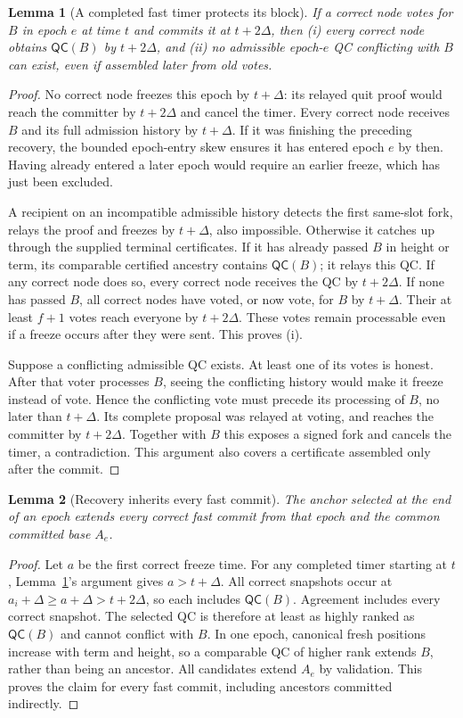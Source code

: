 \documentclass[10pt,a4paper]{article}
\newcommand{\QC}{\mathsf{QC}}
\newtheorem{lemma}{Lemma}
\begin{document}
\begin{lemma}[A completed fast timer protects its block]\label{lem:timer}
If a correct node votes for $B$ in epoch $e$ at time $t$ and commits it at
$t+2\Delta$, then (i) every correct node obtains $\QC(B)$ by $t+2\Delta$,
and (ii) no admissible epoch-$e$ QC conflicting with $B$ can exist, even if
assembled later from old votes.
\end{lemma}
\begin{proof}
No correct node freezes this epoch by $t+\Delta$: its relayed quit proof
would reach the committer by $t+2\Delta$ and cancel the timer. Every correct
node receives $B$ and its full admission history by $t+\Delta$. If it was
finishing the preceding recovery, the bounded epoch-entry skew ensures it
has entered epoch $e$ by then. Having already entered a later epoch would
require an earlier freeze, which has just been excluded.

A recipient on an incompatible admissible history detects the first
same-slot fork, relays the proof and freezes by $t+\Delta$, also impossible.
Otherwise it catches up through the supplied terminal certificates. If it
has already passed $B$ in height or term, its comparable certified ancestry
contains $\QC(B)$; it relays this QC. If any correct node does so, every
correct node receives the QC by $t+2\Delta$. If none has passed $B$, all
correct nodes have voted, or now vote, for $B$ by $t+\Delta$. Their at least
$f+1$ votes reach everyone by $t+2\Delta$. These votes remain processable
even if a freeze occurs after they were sent. This proves (i).

Suppose a conflicting admissible QC exists. At least one of its votes is
honest. After that voter processes $B$, seeing the conflicting history would
make it freeze instead of vote. Hence the conflicting vote must precede
its processing of $B$, no later than $t+\Delta$. Its complete proposal was
relayed at voting, and reaches the committer by $t+2\Delta$. Together with
$B$ this exposes a signed fork and cancels the timer, a contradiction.
This argument also covers a certificate assembled only after the commit.
\end{proof}

\begin{lemma}[Recovery inherits every fast commit]\label{lem:inherit}
The anchor selected at the end of an epoch extends every correct fast
commit from that epoch and the common committed base $A_e$.
\end{lemma}
\begin{proof}
Let $a$ be the first correct freeze time. For any completed timer starting
at $t$, Lemma~\ref{lem:timer}'s argument gives $a>t+\Delta$. All correct
snapshots occur at $a_i+\Delta\ge a+\Delta>t+2\Delta$, so each includes
$\QC(B)$. Agreement includes every correct snapshot. The selected QC is
therefore at least as highly ranked as $\QC(B)$ and cannot conflict with
$B$. In one epoch, canonical fresh positions increase with term and height,
so a comparable QC of higher rank extends $B$, rather than being an ancestor.
All candidates extend $A_e$ by validation. This proves the claim for every
fast commit, including ancestors committed indirectly.
\end{proof}
\end{document}
